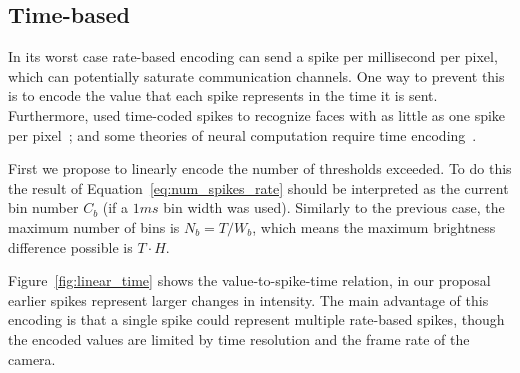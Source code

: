 \documentclass[conference]{IEEEtran}
\begin{document}
\subsection{Time-based}
In its worst case rate-based encoding can send a spike per millisecond per pixel, which can potentially saturate communication channels. One way to prevent this is to encode the value that each spike represents in the time it is sent. Furthermore, \citeauthor{Delorme2001795} used time-coded spikes to recognize faces with as little as one spike per pixel~\cite{Delorme2001795}; and some theories of neural computation require time encoding~\cite{izhikevich2006polychronization}.

First we propose to linearly encode the number of thresholds exceeded. To do this the result of Equation~\ref{eq:num_spikes_rate} should be interpreted as the current bin number $C_{b}$ (if a $1 ms$ bin width was used). Similarly to the previous case, the maximum number of bins is $N_{b}=T/W_{b}$, which means the maximum brightness difference possible is $T\cdot H$.

Figure~\ref{fig:linear_time} shows the value-to-spike-time relation, in our proposal earlier spikes represent larger changes in intensity. The main advantage of this encoding is that a single spike could represent multiple rate-based spikes, though the encoded values are limited by time resolution and the frame rate of the camera.
\end{document}
